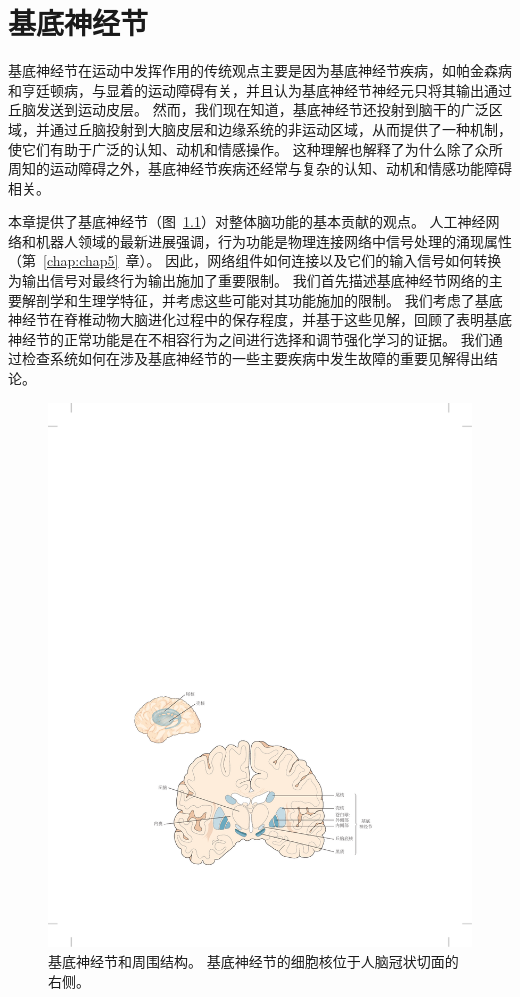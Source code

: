 \chapter{基底神经节} \label{chap:chap38}

基底神经节在运动中发挥作用的传统观点主要是因为基底神经节疾病，如帕金森病和亨廷顿病，与显着的运动障碍有关，并且认为基底神经节神经元只将其输出通过丘脑发送到运动皮层。
然而，我们现在知道，基底神经节还投射到脑干的广泛区域，并通过丘脑投射到大脑皮层和边缘系统的非运动区域，从而提供了一种机制，使它们有助于广泛的认知、动机和情感操作。
这种理解也解释了为什么除了众所周知的运动障碍之外，基底神经节疾病还经常与复杂的认知、动机和情感功能障碍相关。


本章提供了基底神经节（图~\ref{fig:38_1}）对整体脑功能的基本贡献的观点。
人工神经网络和机器人领域的最新进展强调，行为功能是物理连接网络中信号处理的涌现属性（第~\ref{chap:chap5}~章）。
因此，网络组件如何连接以及它们的输入信号如何转换为输出信号对最终行为输出施加了重要限制。
我们首先描述基底神经节网络的主要解剖学和生理学特征，并考虑这些可能对其功能施加的限制。
我们考虑了基底神经节在脊椎动物大脑进化过程中的保存程度，并基于这些见解，回顾了表明基底神经节的正常功能是在不相容行为之间进行选择和调节强化学习的证据。
我们通过检查系统如何在涉及基底神经节的一些主要疾病中发生故障的重要见解得出结论。


\begin{figure}[htbp]
	\centering
	\includegraphics[width=1.0\linewidth]{chap38/fig_38_1}
	\caption{基底神经节和周围结构。
		基底神经节的细胞核位于人脑冠状切面的右侧\cite{nieuwenhuys2007human}。}
	\label{fig:38_1}
\end{figure}



